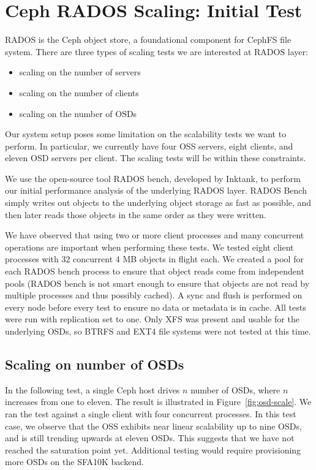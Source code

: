 \documentclass{article}
\begin{document}
\section{Ceph RADOS Scaling: Initial Test}

RADOS is the Ceph object store, a foundational component for CephFS file
system. There are three types of scaling tests we are interested at RADOS layer:

\begin{itemize}
  \item scaling on the number of servers
  \item scaling on the number of clients
  \item scaling on the number of OSDs
\end{itemize}

Our system setup poses some limitation on the scalability tests we want to
perform. In particular, we currently have four OSS servers, eight clients, and eleven OSD servers
per client. The scaling tests will be within these constraints. 

We use the open-source tool RADOS bench, developed by Inktank, to perform our
initial performance analysis of the underlying RADOS layer.  RADOS Bench simply
writes out objects to the underlying object storage as fast as possible, and
then later reads those objects in the same order as they were written.

We have observed that using two or more client processes and many concurrent
operations are important when performing these tests.  We tested eight client processes 
with 32 concurrent 4 MB objects in flight each. We created a pool for
each RADOS bench process to ensure that object reads come from independent pools
(RADOS bench is not smart enough to ensure that objects are not read by multiple
processes and thus possibly cached).  A sync and flush is performed on every
node before every test to ensure no data or metadata is in cache.  All tests
were run with replication set to one.  Only XFS was present
and usable for the underlying OSDs, so BTRFS and EXT4 file systems were not
tested at this time.


\subsection{Scaling on number of OSDs}

In the following test, a single Ceph host drives $n$ number of OSDs, where $n$
increases from one to eleven. The result is illustrated in Figure~\ref{fig:osd-scale}.
We ran the test against a single client with four concurrent processes. In this test
case, we observe that the OSS exhibits near linear scalability up to nine
OSDs, and is still trending upwards at eleven OSDs. This suggests that we have not reached the
saturation point yet. Additional testing would require provisioning more OSDs on the SFA10K backend.
\end{document}
